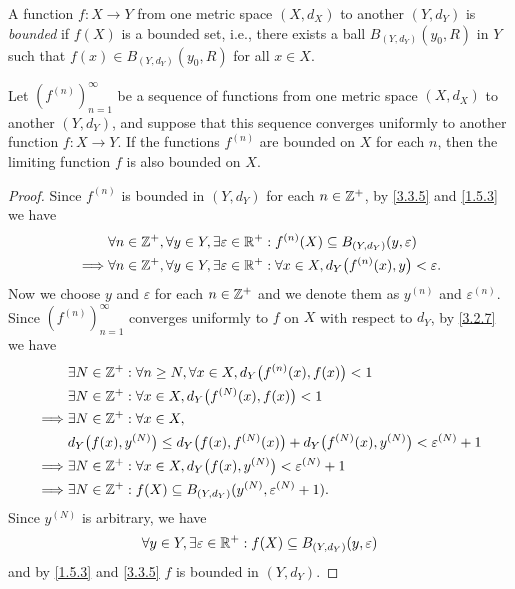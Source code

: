 \begin{defn}\label{3.3.5}
  A function \(f : X \to Y\) from one metric space \((X, d_X)\) to another \((Y, d_Y)\) is \emph{bounded} if \(f(X)\) is a bounded set, i.e., there exists a ball \(B_{(Y, d_Y)}(y_0, R)\) in \(Y\) such that \(f(x) \in B_{(Y, d_Y)}(y_0, R)\) for all \(x \in X\).
\end{defn}

\begin{prop}\label{3.3.6}
  Let \((f^{(n)})_{n = 1}^\infty\) be a sequence of functions from one metric space \((X, d_X)\) to another \((Y, d_Y)\), and suppose that this sequence converges uniformly to another function \(f : X \to Y\).
  If the functions \(f^{(n)}\) are bounded on \(X\) for each \(n\), then the limiting function \(f\) is also bounded on \(X\).
\end{prop}

\begin{proof}
  Since \(f^{(n)}\) is bounded in \((Y, d_Y)\) for each \(n \in \mathbb{Z}^+\), by \cref{3.3.5} and \cref{1.5.3} we have
  \begin{align*}
             & \forall n \in \mathbb{Z}^+, \forall y \in Y, \exists \varepsilon \in \mathbb{R}^+ : f^{(n)}(X) \subseteq B_{(Y, d_Y)}(y, \varepsilon)          \\
    \implies & \forall n \in \mathbb{Z}^+, \forall y \in Y, \exists \varepsilon \in \mathbb{R}^+ : \forall x \in X, d_Y\big(f^{(n)}(x), y\big) < \varepsilon.
  \end{align*}
  Now we choose \(y\) and \(\varepsilon\) for each \(n \in \mathbb{Z}^+\) and we denote them as \(y^{(n)}\) and \(\varepsilon^{(n)}\).
  Since \((f^{(n)})_{n = 1}^\infty\) converges uniformly to \(f\) on \(X\) with respect to \(d_Y\), by \cref{3.2.7} we have
  \begin{align*}
             & \exists N \in \mathbb{Z}^+ : \forall n \geq N, \forall x \in X, d_Y\big(f^{(n)}(x), f(x)\big) < 1                                \\
             & \exists N \in \mathbb{Z}^+ : \forall x \in X, d_Y\big(f^{(N)}(x), f(x)\big) < 1                                                  \\
    \implies & \exists N \in \mathbb{Z}^+ : \forall x \in X,                                                                                    \\
             & d_Y\big(f(x), y^{(N)}\big) \leq d_Y\big(f(x), f^{(N)}(x)\big) + d_Y\big(f^{(N)}(x), y^{(N)}\big) < \varepsilon^{(N)} + 1 \\
    \implies & \exists N \in \mathbb{Z}^+ : \forall x \in X, d_Y\big(f(x), y^{(N)}\big) < \varepsilon^{(N)} + 1                                 \\
    \implies & \exists N \in \mathbb{Z}^+ : f(X) \subseteq B_{(Y, d_Y)}(y^{(N)}, \varepsilon^{(N)} + 1).
  \end{align*}
  Since \(y^{(N)}\) is arbitrary, we have
  \[
    \forall y \in Y, \exists \varepsilon \in \mathbb{R}^+ : f(X) \subseteq B_{(Y, d_Y)}(y, \varepsilon)
  \]
  and by \cref{1.5.3} and \cref{3.3.5} \(f\) is bounded in \((Y, d_Y)\).
\end{proof}

